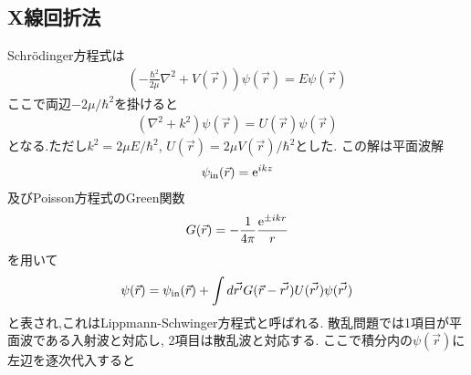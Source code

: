 \subsection{X線回折法}
Schr\"{o}dinger方程式は
\begin{align}
  \left(-\frac{\hbar^2}{2\mu}\nabla^2+V(\vec{r})\right)\psi(\vec{r})=E\psi(\vec{r})
\end{align}
ここで両辺$-2\mu/\hbar^2$を掛けると
\begin{align}
  (\nabla^2+k^2)\psi(\vec{r})=U(\vec{r})\psi(\vec{r})
\end{align}
となる.ただし$k^2=2\mu E/\hbar^2$, $U(\vec{r})=2\mu V(\vec{r})/\hbar^2$とした.
この解は平面波解
\begin{align}
  \psi_{\rm in}(\vec{r})={\rm e}^{ikz}
\end{align}
及びPoisson方程式のGreen関数
\begin{align}
  G(\vec{r})=-\frac{1}{4\pi}\frac{{\rm e}^{\pm ikr}}{r}
\end{align}
を用いて
\begin{align}
  \psi(\vec{r})=\psi_{\rm in}(\vec{r})+\int d\vec{r'}G(\vec{r}-\vec{r'})U(\vec{r'})\psi(\vec{r'})
\end{align}
と表され,これはLippmann-Schwinger方程式と呼ばれる.
散乱問題では1項目が平面波である入射波と対応し,
2項目は散乱波と対応する.
ここで積分内の$\psi(\vec{r})$に左辺を逐次代入すると